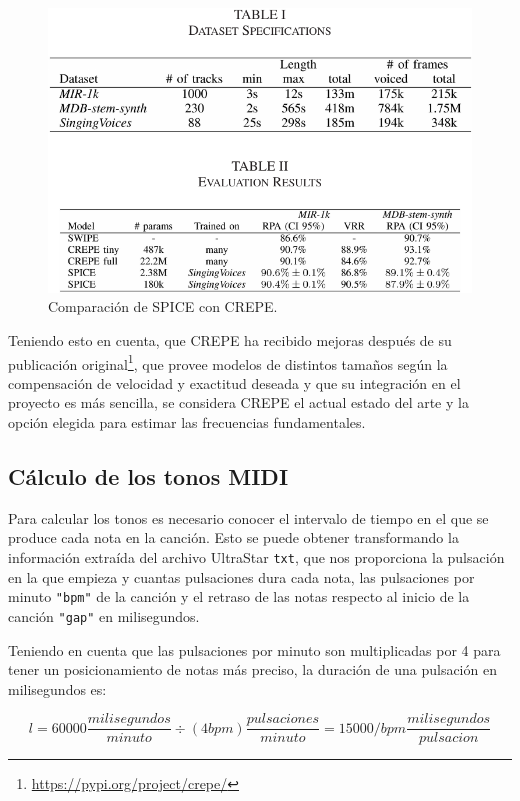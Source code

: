 \begin{figure}[h!]
	\centering
	\includegraphics[width=0.7\linewidth]{logos/spice_comparison}
	\caption{Comparación de SPICE con CREPE\protect\footnotemark.}
	\label{fig:spicecomparison}
\end{figure}


Teniendo esto en cuenta, que CREPE ha recibido mejoras después de su publicación original\footnote{\url{https://pypi.org/project/crepe/}}, que provee modelos de distintos tamaños según la compensación de velocidad y exactitud deseada y que su integración en el proyecto es más sencilla, se considera CREPE el actual estado del arte y la opción elegida para estimar las frecuencias fundamentales.

\subsection{Cálculo de los tonos MIDI}

Para calcular los tonos es necesario conocer el intervalo de tiempo en el que se produce cada nota en la canción. Esto se puede obtener transformando la información extraída del archivo UltraStar \texttt{txt}, que nos proporciona la pulsación en la que empieza y cuantas pulsaciones dura cada nota, las pulsaciones por minuto \texttt{"bpm"} de la canción y el retraso de las notas respecto al inicio de la canción \texttt{"gap"} en milisegundos.

Teniendo en cuenta que las pulsaciones por minuto son multiplicadas por 4 para tener un posicionamiento de notas más preciso, la duración de una pulsación en milisegundos es:

\begin{displaymath}
	l = 60000 \frac{milisegundos}{minuto} \div (4bpm)\frac{pulsaciones}{minuto} = 15000 / bpm\frac{milisegundos}{pulsacion}
\end{displaymath}

